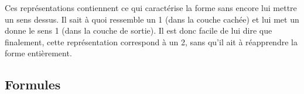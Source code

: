   Ces représentations contiennent ce qui caractérise la forme sans encore lui mettre un sens dessus.
  Il sait à quoi ressemble un 1 (dans la couche cachée) et lui met un donne le sens 1 (dans la couche de sortie).
  Il est donc facile de lui dire que finalement, cette représentation correspond à un 2, sans qu'il ait à réapprendre
  la forme entièrement.
  

  \newpage 
  \subsection{Formules}
    
    



